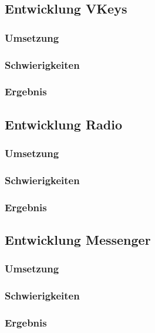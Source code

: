 \documentclass[a4paper, 11pt]{scrartcl}
\begin{document}
\subsection{Entwicklung VKeys}
\subsubsection{Umsetzung}


\subsubsection{Schwierigkeiten}



\subsubsection{Ergebnis}

\subsection{Entwicklung Radio}
\subsubsection{Umsetzung}


\subsubsection{Schwierigkeiten}



\subsubsection{Ergebnis}

\subsection{Entwicklung Messenger}
\subsubsection{Umsetzung}


\subsubsection{Schwierigkeiten}



\subsubsection{Ergebnis}
\end{document}
